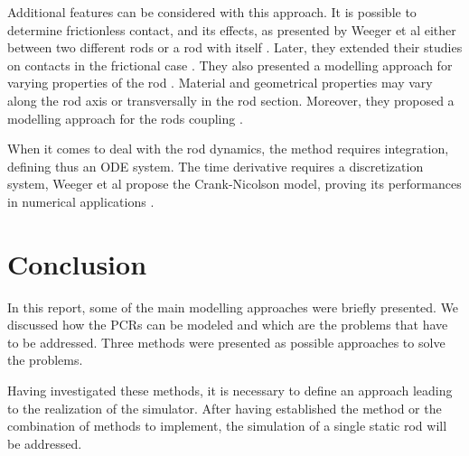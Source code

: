 \documentclass{thesisreport}
\begin{document}
 Additional features can be considered with this approach. It is possible to determine frictionless contact, and its effects, as presented by Weeger et al either between two different rods or a rod with itself \cite{weeger_isogeometric_2017}. Later, they extended their studies on contacts in the frictional case \cite{weeger_isogeometric_2018}. They also presented a modelling approach for varying properties of the rod \cite{weeger_fully_2018}. Material and geometrical properties may vary along the rod axis or transversally in the rod section. Moreover, they proposed a modelling approach for the rods coupling \cite{weeger_isogeometric_2017-1}.
 
 When it comes to deal with the rod dynamics, the method requires integration, defining thus an ODE system. The time derivative requires a discretization system, Weeger et al propose the Crank-Nicolson model, proving its performances in numerical applications \cite{weeger_isogeometric_2018}. 


 \chapter*{Conclusion}
 
 In this report, some of the main modelling approaches were briefly presented. We discussed how the PCRs can be modeled and which are the problems that have to be addressed. Three methods were presented as possible approaches to solve the problems. 
 
 
 Having investigated these methods, it is necessary to define an approach leading to the realization of the simulator. After having established the method or the combination of methods to implement, the simulation of a single static rod will be addressed. 
 
 

 
 
 
 
 
 
\end{document}
